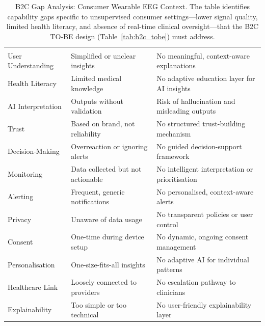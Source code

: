 {\tablestripes\tablefontsize

\begin{xltabular}{\textwidth}{@{} >{\raggedright\arraybackslash}p{3.2cm} L L @{}}
\caption[B2C Gap Analysis: Consumer Wearable EEG Context]{B2C Gap Analysis: Consumer Wearable EEG Context. The table identifies capability gaps specific to unsupervised consumer settings---lower signal quality, limited health literacy, and absence of real-time clinical oversight---that the B2C TO-BE design (Table~\ref{tab:b2c_tobe}) must address.}\label{tab:b2c_gap} \\
\toprule
{} &  &  \\
\midrule
\endfirsthead
\toprule
{} &  &  \\
\midrule
\endhead
\bottomrule
\endlastfoot
User Understanding & Simplified or unclear insights & No meaningful, context-aware explanations \\
\addlinespace
Health Literacy & Limited medical knowledge & No adaptive education layer for AI insights \\
\addlinespace
AI Interpretation & Outputs without validation & Risk of hallucination and misleading outputs \\
\addlinespace
Trust & Based on brand, not reliability & No structured trust-building mechanism \\
\addlinespace
Decision-Making & Overreaction or ignoring alerts & No guided decision-support framework \\
\addlinespace
Monitoring & Data collected but not actionable & No intelligent interpretation or prioritisation \\
\addlinespace
Alerting & Frequent, generic notifications & No personalised, context-aware alerts \\
\addlinespace
Privacy & Unaware of data usage & No transparent policies or user control \\
\addlinespace
Consent & One-time during device setup & No dynamic, ongoing consent management \\
\addlinespace
Personalisation & One-size-fits-all insights & No adaptive AI for individual patterns \\
\addlinespace
Healthcare Link & Loosely connected to providers & No escalation pathway to clinicians \\
\addlinespace
Explainability & Too simple or too technical & No user-friendly explainability layer \\

\end{xltabular}}
